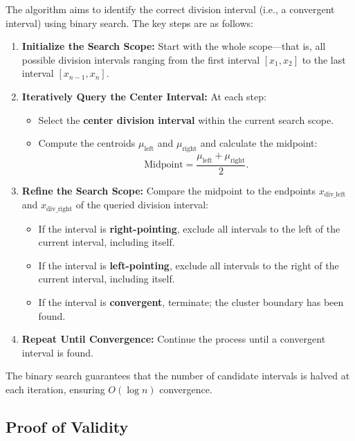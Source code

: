 The algorithm aims to identify the correct division interval (i.e., a convergent interval) using binary search. The key steps are as follows:

\begin{enumerate}
    \item \textbf{Initialize the Search Scope:}  
    Start with the whole scope---that is, all possible division intervals ranging from the first interval \([x_1, x_2]\) to the last interval \([x_{n-1}, x_n]\).

    \item \textbf{Iteratively Query the Center Interval:}  
    At each step:
    \begin{itemize}
        \item Select the \textbf{center division interval} within the current search scope.
        \item Compute the centroids \(\mu_{\text{left}}\) and \(\mu_{\text{right}}\) and calculate the midpoint:
        \[
        \text{Midpoint} = \frac{\mu_{\text{left}} + \mu_{\text{right}}}{2}.
        \]
    \end{itemize}

    \item \textbf{Refine the Search Scope:}
    Compare the midpoint to the endpoints $x_{\text{div\_left}}$ and $x_{\text{div\_right}}$ of the queried division interval:
    \begin{itemize}
        \item If the interval is \textbf{right-pointing}, exclude all intervals to the left of the current interval, including itself.
        \item If the interval is \textbf{left-pointing}, exclude all intervals to the right of the current interval, including itself.
        \item If the interval is \textbf{convergent}, terminate; the cluster boundary has been found.
    \end{itemize}

    \item \textbf{Repeat Until Convergence:}  
    Continue the process until a convergent interval is found.
\end{enumerate}

The binary search guarantees that the number of candidate intervals is halved at each iteration, ensuring \(O(\log n)\) convergence.

\subsection{Proof of Validity}

